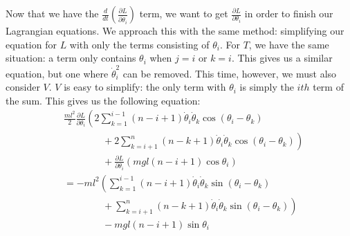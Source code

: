 \documentclass{article}
\begin{document}
Now that we have the $\frac{d}{dt}\left(\frac{\partial L}{\partial \dot\theta_i}\right)$ term, we want to get $\frac{\partial L}{\partial \theta_i}$ in order to finish our Lagrangian equations. We approach this with the same method: simplifying our equation for $L$ with only the terms consisting of $\theta_i$. For $T$, we have the same situation: a term only contains $\theta_i$ when $j=i$ or $k=i$. This gives us a similar equation, but one where $\dot\theta_i^2$ can be removed. This time, however, we must also consider $V$. $V$ is easy to simplify: the only term with $\theta_i$ is simply the $ith$ term of the sum. This gives us the following equation:
\begin{align*}
&\frac{ml^2}{2}\frac{\partial L}{\partial \theta_i}\left(2\sum_{k=1}^{i-1}(n-i+1)\dot\theta_i\dot\theta_k\cos(\theta_i-\theta_k)\right.\\
&\qquad\qquad+ \left.2\sum_{k=i+1}^n(n-k+1)\dot\theta_i\dot\theta_k\cos(\theta_i-\theta_k)\right)\\
&\qquad\qquad+ \frac{\partial L}{\partial \theta_i}\left(mgl(n-i+1)\cos\theta_i\right)\\
&=-ml^2\left(\sum_{k=1}^{i-1}(n-i+1)\dot\theta_i\dot\theta_k\sin(\theta_i-\theta_k)\right.\\
&\qquad\qquad+ \left.\sum_{k=i+1}^n(n-k+1)\dot\theta_i\dot\theta_k\sin(\theta_i-\theta_k)\right)\\
&\qquad\qquad- mgl(n-i+1)\sin\theta_i\\
\end{align*}
\end{document}

